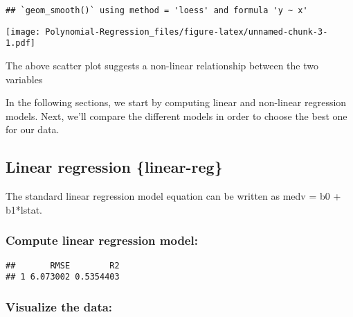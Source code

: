 \documentclass[]{article}
\newenvironment{Shaded}{\begin{snugshade}}{\end{snugshade}}
\newcommand{\CommentTok}[1]{\textcolor[rgb]{0.56,0.35,0.01}{\textit{#1}}}
\newcommand{\DataTypeTok}[1]{\textcolor[rgb]{0.13,0.29,0.53}{#1}}
\newcommand{\KeywordTok}[1]{\textcolor[rgb]{0.13,0.29,0.53}{\textbf{#1}}}
\newcommand{\NormalTok}[1]{#1}
\newcommand{\OperatorTok}[1]{\textcolor[rgb]{0.81,0.36,0.00}{\textbf{#1}}}
\newcommand{\StringTok}[1]{\textcolor[rgb]{0.31,0.60,0.02}{#1}}
\begin{document}
\begin{verbatim}
## `geom_smooth()` using method = 'loess' and formula 'y ~ x'
\end{verbatim}

\texttt{[image: Polynomial-Regression\_files/figure-latex/unnamed-chunk-3-1.pdf]}

The above scatter plot suggests a non-linear relationship between the
two variables

In the following sections, we start by computing linear and non-linear
regression models. Next, we'll compare the different models in order to
choose the best one for our data.

\hypertarget{linear-regression-linear-reg}{%
\subsection{Linear regression
\{linear-reg\}}\label{linear-regression-linear-reg}}

The standard linear regression model equation can be written as medv =
b0 + b1*lstat.

\hypertarget{compute-linear-regression-model}{%
\subsubsection{Compute linear regression
model:}\label{compute-linear-regression-model}}

\begin{Shaded}
\end{Shaded}

\begin{verbatim}
##       RMSE        R2
## 1 6.073002 0.5354403
\end{verbatim}

\hypertarget{visualize-the-data}{%
\subsubsection{Visualize the data:}\label{visualize-the-data}}
\end{document}

